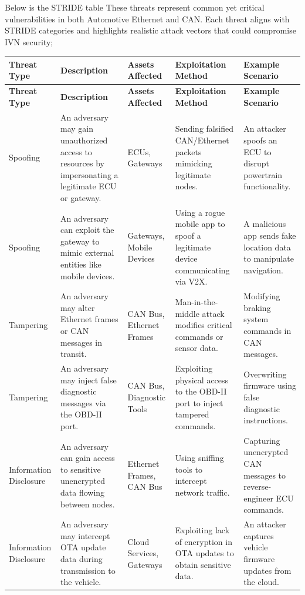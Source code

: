 \documentclass{report}
\begin{document}
Below is the STRIDE table These threats represent common yet critical vulnerabilities in both Automotive Ethernet and CAN. Each threat aligns with STRIDE categories and highlights realistic attack vectors that could compromise IVN security;
\begin{longtable}{|>{\raggedright\arraybackslash}p{2cm}|>{\raggedright\arraybackslash}p{4cm}|>{\raggedright\arraybackslash}p{3cm}|>{\raggedright\arraybackslash}p{3cm}|>{\raggedright\arraybackslash}p{3cm}|}
    \hline
    \textbf{Threat Type} & \textbf{Description} & \textbf{Assets Affected} & \textbf{Exploitation Method} & \textbf{Example Scenario} \\
    \hline
    \endfirsthead
    \hline
    \textbf{Threat Type} & \textbf{Description} & \textbf{Assets Affected} & \textbf{Exploitation Method} & \textbf{Example Scenario} \\
    \hline
    \endhead
    \hline
    \endfoot
    \hline
    \endlastfoot
    Spoofing & An adversary may gain unauthorized access to resources by impersonating a legitimate ECU or gateway. & ECUs, Gateways & Sending falsified CAN/Ethernet packets mimicking legitimate nodes. & An attacker spoofs an ECU to disrupt powertrain functionality. \\
    \hline
    Spoofing & An adversary can exploit the gateway to mimic external entities like mobile devices. & Gateways, Mobile Devices & Using a rogue mobile app to spoof a legitimate device communicating via V2X. & A malicious app sends fake location data to manipulate navigation. \\
    \hline
    Tampering & An adversary may alter Ethernet frames or CAN messages in transit. & CAN Bus, Ethernet Frames & Man-in-the-middle attack modifies critical commands or sensor data. & Modifying braking system commands in CAN messages. \\
    \hline
    Tampering & An adversary may inject false diagnostic messages via the OBD-II port. & CAN Bus, Diagnostic Tools & Exploiting physical access to the OBD-II port to inject tampered commands. & Overwriting firmware using false diagnostic instructions. \\
    \hline
    Information Disclosure & An adversary can gain access to sensitive unencrypted data flowing between nodes. & Ethernet Frames, CAN Bus & Using sniffing tools to intercept network traffic. & Capturing unencrypted CAN messages to reverse-engineer ECU commands. \\
    \hline
    Information Disclosure & An adversary may intercept OTA update data during transmission to the vehicle. & Cloud Services, Gateways & Exploiting lack of encryption in OTA updates to obtain sensitive data. & An attacker captures vehicle firmware updates from the cloud. \\

\end{longtable}
\end{document}

